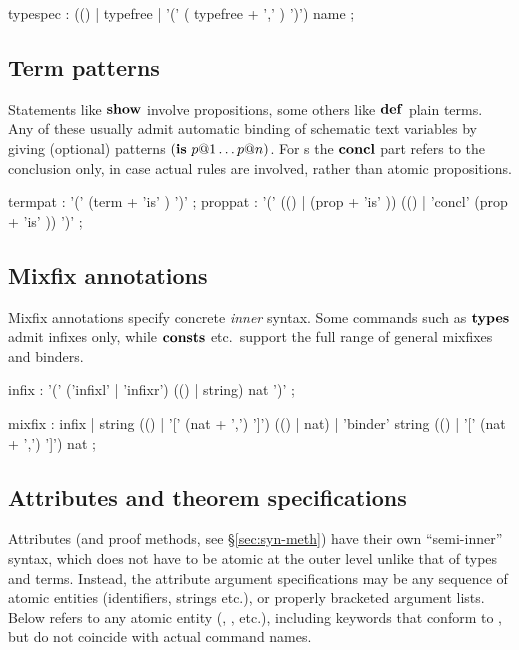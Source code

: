 \begin{rail}
  typespec : (() | typefree | '(' ( typefree + ',' ) ')') name
  ;
\end{rail}


\subsection{Term patterns}

Statements like ${\mathord{\mathbf{show}}}$ involve propositions, some others like ${\mathord{\mathbf{def}}}$
plain terms.  Any of these usually admit automatic binding of schematic text
variables by giving (optional) patterns $({\mathord{\mathbf{is}}}~p@1 \dots p@n)$.  For
s the ${\mathord{\mathbf{concl}}}$ part refers to the conclusion only, in case
actual rules are involved, rather than atomic propositions.

\begin{rail}
  termpat : '(' (term + 'is' ) ')'
  ;
  proppat : '(' (() | (prop + 'is' )) (() | 'concl' (prop + 'is' )) ')'
  ;
\end{rail}


\subsection{Mixfix annotations}

Mixfix annotations specify concrete \emph{inner} syntax.  Some commands such
as ${\mathord{\mathbf{types}}}$ admit infixes only, while ${\mathord{\mathbf{consts}}}$ etc.\ support the full range
of general mixfixes and binders.

\begin{rail}
  infix : '(' ('infixl' | 'infixr') (() | string) nat ')'
  ;

  mixfix : infix | string (() | '[' (nat + ',') ']') (() | nat) |
  'binder' string (() | '[' (nat + ',') ']') nat
  ;
\end{rail}


\subsection{Attributes and theorem specifications}\label{sec:syn-att}

Attributes (and proof methods, see \S\ref{sec:syn-meth}) have their own
``semi-inner'' syntax, which does not have to be atomic at the outer level
unlike that of types and terms.  Instead, the attribute argument
specifications may be any sequence of atomic entities (identifiers, strings
etc.), or properly bracketed argument lists.  Below  refers to
any atomic entity (, ,
 etc.), including keywords that conform to
, but do not coincide with actual command names.

